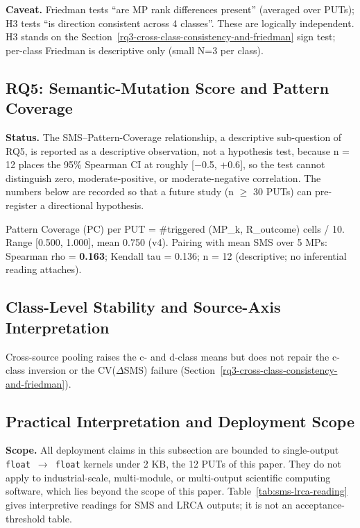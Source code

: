 \documentclass[review,12pt,authoryear]{elsarticle}
\begin{document}
\textbf{Caveat.} Friedman tests ``are MP rank differences present''
(averaged over PUTs); H3 tests ``is direction consistent across 4
classes''. These are logically independent. H3 stands on the Section~\ref{rq3-cross-class-consistency-and-friedman} sign
test; per-class Friedman is descriptive only (small N=3 per class).

\subsection{RQ5: Semantic-Mutation Score and Pattern Coverage}\label{rq4-sms-vs-pattern-coverage}

\textbf{Status.} The SMS--Pattern-Coverage relationship, a descriptive
sub-question of RQ5, is reported as a descriptive observation, not a
hypothesis test, because n = 12 places the 95\% Spearman CI at roughly
{[}−0.5, +0.6{]}, so the test cannot distinguish zero,
moderate-positive, or moderate-negative correlation. The numbers below
are recorded so that a future study (n $\geq$ 30 PUTs) can pre-register a directional
hypothesis.

Pattern Coverage (PC) per PUT = \#triggered (MP\_k, R\_outcome) cells /
10. Range {[}0.500, 1.000{]}, mean 0.750 (v4). Pairing with mean SMS over 5
MPs: Spearman rho = \textbf{0.163}; Kendall tau = 0.136; n = 12
(descriptive; no inferential reading attaches).

\subsection{Class-Level Stability and Source-Axis Interpretation}\label{h4-partial-across-same-source-and-cross-source}

Cross-source pooling raises the c- and d-class means but does not repair
the c-class inversion or the CV($\Delta$SMS) failure
(Section~\ref{rq3-cross-class-consistency-and-friedman}).

\subsection{Practical Interpretation and Deployment Scope}\label{stakeholder-analysis-single-output-kernels-scope}

\textbf{Scope.} All deployment claims in this subsection are bounded to
single-output \texttt{float\ $\to$\ float} kernels under 2 KB, the 12 PUTs
of this paper. They do not apply to industrial-scale, multi-module, or
multi-output scientific computing software, which lies beyond the scope of this paper.
Table~\ref{tab:sms-lrca-reading} gives interpretive readings for SMS and
LRCA outputs; it is not an acceptance-threshold table.
\end{document}
